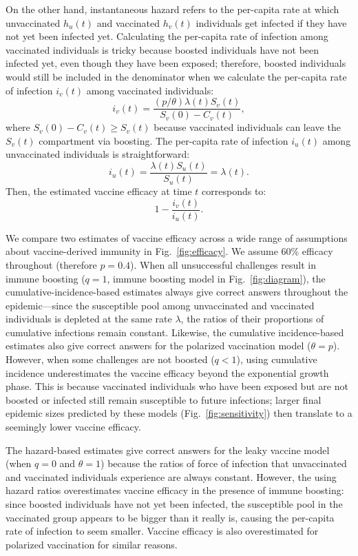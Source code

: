 \documentclass[12pt]{article}
\newcommand{\fref}[1]{Fig.~\ref{fig:#1}}
\begin{document}
On the other hand, instantaneous hazard refers to the per-capita rate at which unvaccinated $h_u(t)$ and vaccinated $h_v(t)$ individuals get infected if they have not yet been infected yet.
Calculating the per-capita rate of infection among vaccinated individuals is tricky because boosted individuals have not been infected yet, even though they have been exposed; therefore, boosted individuals would still be included in the denominator when we calculate the per-capita rate of infection $i_v(t)$ among vaccinated individuals:
\begin{equation}
i_v(t) = \frac{(p/\theta) \lambda(t) S_v(t)}{S_v(0) - C_v(t)},
\end{equation}
where $S_v(0) - C_v(t) \geq S_v(t)$ because vaccinated individuals can leave the $S_v(t)$ compartment via boosting.
The per-capita rate of infection $i_u(t)$ among unvaccinated individuals is straightforward: 
\begin{equation}
i_u(t) = \frac{\lambda(t) S_u(t)}{S_u(t)} = \lambda(t).
\end{equation}
Then, the estimated vaccine efficacy at time $t$ corresponds to:
\begin{equation}
1 - \frac{i_v(t)}{i_u(t)}.
\end{equation}

We compare two estimates of vaccine efficacy across a wide range of assumptions about vaccine-derived immunity in \fref{efficacy}.
We assume 60\% efficacy throughout (therefore $p = 0.4$).
When all unsuccessful challenges result in immune boosting ($q=1$, immune boosting model in \fref{diagram}), the cumulative-incidence-based estimates always give correct answers throughout the epidemic---since the susceptible pool among unvaccinated and vaccinated individuals is depleted at the same rate $\lambda$, the ratios of their proportions of cumulative infections remain constant.
Likewise, the cumulative incidence-based estimates also give correct answers for the polarized vaccination model ($\theta = p$).
However, when some challenges are not boosted ($q < 1$), using cumulative incidence underestimates the vaccine efficacy beyond the exponential growth phase.
This is because vaccinated individuals who have been exposed but are not boosted or infected still remain susceptible to future infections; 
larger final epidemic sizes predicted by these models (\fref{sensitivity}) then translate to a seemingly lower vaccine efficacy.

The hazard-based estimates give correct answers for the leaky vaccine model (when $q=0$ and $\theta=1$) because the ratios of force of infection that unvaccinated and vaccinated individuals experience are always constant.
However, the using hazard ratios overestimates vaccine efficacy in the presence of immune boosting: since boosted individuals have not yet been infected, the susceptible pool in the vaccinated group appears to be bigger than it really is, causing the per-capita rate of infection to seem smaller.
Vaccine efficacy is also overestimated for polarized vaccination for similar reasons.
\end{document}
